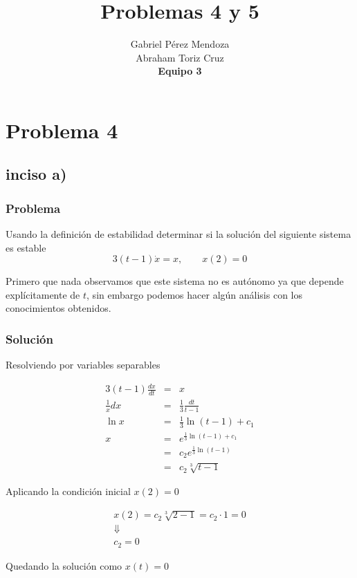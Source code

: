\documentclass[10pt,letterpaper,titlepage]{article}
\author{Gabriel Pérez Mendoza\\
Abraham Toriz Cruz\\
\textbf{Equipo 3}}
\title{Problemas 4 y 5}
\begin{document}
\begin{titlepage}
	\maketitle
\end{titlepage}

\section{Problema 4}

\subsection{inciso a)}

\subsubsection{Problema}
Usando la definición de estabilidad determinar si la solución del siguiente sistema es estable
\[
	3(t-1)\dot{x} = x, \qquad x(2)=0
\]

Primero que nada observamos que este sistema no es autónomo ya que depende explícitamente de $t$, sin embargo podemos hacer algún análisis con los conocimientos obtenidos.

\subsubsection{Solución}
Resolviendo por variables separables

\[
	\begin{array}{rcl}
		3(t-1)\frac{dx}{dt} & = & x\\
		\frac{1}{x} dx & = & \frac{1}{3}\frac{dt}{t-1}\\
		\ln x & = & \frac{1}{3}\ln(t-1) + c_1\\
		x & = & e^{\frac{1}{3}\ln(t-1) + c_1}\\
		& = & c_2 e^{\frac{1}{3}\ln(t-1)}\\
		& = & c_2 \sqrt[3]{t-1}
	\end{array}
\]

Aplicando la condición inicial $x(2)=0$

\[
	\begin{array}{c}
		x(2) = c_2 \sqrt[3]{2-1} = c_2 \cdot 1 = 0\\
		\Downarrow\\
		c_2 = 0
	\end{array}
\]

Quedando la solución como $x(t) = 0$
\end{document}
